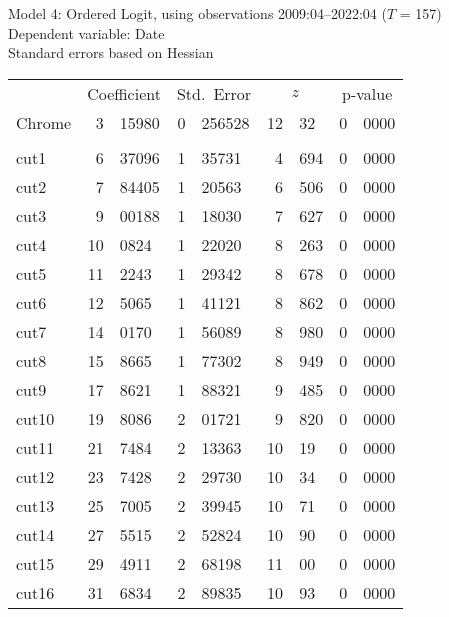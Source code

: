 \documentclass[11pt]{article}
\begin{document}
\thispagestyle{empty}

\begin{center}

Model 4: Ordered Logit, using observations 2009:04--2022:04 ($T$ = 157)\\
Dependent variable: Date\\
Standard errors based on Hessian

\vspace{1em}

\begin{tabular}{lr@{.}lr@{.}lr@{.}lr@{.}l}
  &
 \multicolumn{2}{c}{Coefficient} &
  \multicolumn{2}{c}{Std.\ Error} &
   \multicolumn{2}{c}{$z$} &
    \multicolumn{2}{c}{p-value} \\[1ex]
Chrome &
  3&15980 &
    0&256528 &
      12&32 &
        0&0000 \\
\\ 
cut1 &
  6&37096 &
    1&35731 &
      4&694 &
        0&0000 \\
cut2 &
  7&84405 &
    1&20563 &
      6&506 &
        0&0000 \\
cut3 &
  9&00188 &
    1&18030 &
      7&627 &
        0&0000 \\
cut4 &
  10&0824 &
    1&22020 &
      8&263 &
        0&0000 \\
cut5 &
  11&2243 &
    1&29342 &
      8&678 &
        0&0000 \\
cut6 &
  12&5065 &
    1&41121 &
      8&862 &
        0&0000 \\
cut7 &
  14&0170 &
    1&56089 &
      8&980 &
        0&0000 \\
cut8 &
  15&8665 &
    1&77302 &
      8&949 &
        0&0000 \\
cut9 &
  17&8621 &
    1&88321 &
      9&485 &
        0&0000 \\
cut10 &
  19&8086 &
    2&01721 &
      9&820 &
        0&0000 \\
cut11 &
  21&7484 &
    2&13363 &
      10&19 &
        0&0000 \\
cut12 &
  23&7428 &
    2&29730 &
      10&34 &
        0&0000 \\
cut13 &
  25&7005 &
    2&39945 &
      10&71 &
        0&0000 \\
cut14 &
  27&5515 &
    2&52824 &
      10&90 &
        0&0000 \\
cut15 &
  29&4911 &
    2&68198 &
      11&00 &
        0&0000 \\
cut16 &
  31&6834 &
    2&89835 &
      10&93 &
        0&0000 \\

\end{tabular}
\end{center}
\end{document}
